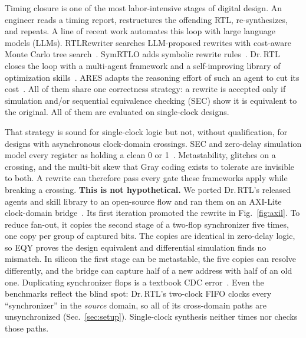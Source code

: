 \documentclass[conference,10pt]{IEEEtran}
\begin{document}
Timing closure is one of the most labor-intensive stages of digital design. An engineer reads a timing report,
restructures the offending RTL, re-synthesizes, and repeats. A line of recent work automates this loop with large
language models (LLMs). RTLRewriter searches LLM-proposed rewrites with cost-aware Monte Carlo tree
search~\cite{rtlrewriter2024}. SymRTLO adds symbolic rewrite rules~\cite{symrtlo2025}. Dr.\,RTL closes the loop with
a multi-agent framework and a self-improving library of optimization skills~\cite{drrtl2026}. ARES adapts the
reasoning effort of such an agent to cut its cost~\cite{ares2027}. All of them share one correctness strategy: a
rewrite is accepted only if simulation and/or sequential equivalence checking (SEC) show it is equivalent to the
original. All of them are evaluated on single-clock designs.

That strategy is sound for single-clock logic but not, without qualification, for designs with asynchronous
clock-domain crossings. SEC and zero-delay simulation model every register as holding a clean 0 or
1~\cite{eqy}. Metastability, glitches on a crossing, and the multi-bit skew that Gray coding exists to tolerate are
invisible to both. A rewrite can therefore pass every gate these frameworks apply while breaking a crossing.
\textbf{This is not hypothetical.} We ported Dr.\,RTL's released agents and skill library to an open-source flow
and ran them on an AXI-Lite clock-domain bridge~\cite{forencich}. Its first iteration promoted the rewrite in
Fig.~\ref{fig:axil}. To reduce fan-out, it copies the second stage of a two-flop synchronizer five times, one copy per
group of captured bits. The copies are identical in zero-delay logic, so EQY proves the design equivalent and
differential simulation finds no mismatch. In silicon the first stage can be metastable, the five copies can resolve
differently, and the bridge can capture half of a new address with half of an old one. Duplicating synchronizer
flops is a textbook CDC error~\cite{cummings2008cdc}. Even the benchmarks reflect the blind spot: Dr.\,RTL's
two-clock FIFO clocks every ``synchronizer'' in the \emph{source} domain, so all of its cross-domain paths are
unsynchronized (Sec.~\ref{sec:setup}). Single-clock synthesis neither times nor checks those paths.
\end{document}
